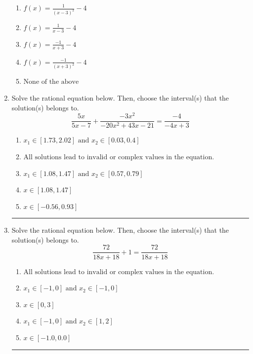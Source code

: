 \documentclass[14pt]{extbook}
\newcommand{\litem}[1]{\item#1\hspace*{-1cm}\rule{\textwidth}{0.4pt}}
\begin{document}
\begin{enumerate}
{\begin{center}
\end{center}
\begin{enumerate}[label=\Alph*.]
\item \( f(x) = \frac{1}{(x - 3)^2} - 4 \)
\item \( f(x) = \frac{1}{x - 3} - 4 \)
\item \( f(x) = \frac{-1}{x + 3} - 4 \)
\item \( f(x) = \frac{-1}{(x + 3)^2} - 4 \)
\item \( \text{None of the above} \)

\end{enumerate} }
\litem{
Solve the rational equation below. Then, choose the interval(s) that the solution(s) belongs to.\[ \frac{5x}{5x -7} + \frac{-3x^{2}}{-20x^{2} +43 x -21} = \frac{-4}{-4x + 3} \]\begin{enumerate}[label=\Alph*.]
\item \( x_1 \in [1.73, 2.02] \text{ and } x_2 \in [0.03,0.4] \)
\item \( \text{All solutions lead to invalid or complex values in the equation.} \)
\item \( x_1 \in [1.08, 1.47] \text{ and } x_2 \in [0.57,0.79] \)
\item \( x \in [1.08,1.47] \)
\item \( x \in [-0.56,0.93] \)

\end{enumerate} }
\litem{
Solve the rational equation below. Then, choose the interval(s) that the solution(s) belongs to.\[ \frac{72}{18x + 18} + 1 = \frac{72}{18x + 18} \]\begin{enumerate}[label=\Alph*.]
\item \( \text{All solutions lead to invalid or complex values in the equation.} \)
\item \( x_1 \in [-1, 0] \text{ and } x_2 \in [-1,0] \)
\item \( x \in [0,3] \)
\item \( x_1 \in [-1, 0] \text{ and } x_2 \in [1,2] \)
\item \( x \in [-1.0,0.0] \)


\end{enumerate}}
\end{enumerate}
\end{document}
